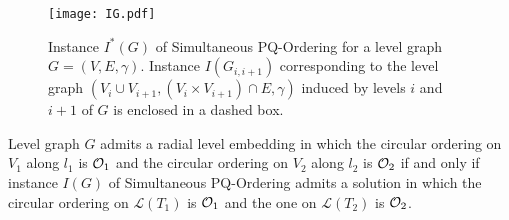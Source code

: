 \documentclass{llncs}
\begin{document}
\begin{figure}[tb]
\centering
\texttt{[image: IG.pdf]}
\caption{Instance $I^*(G)$ of {\sc Simultaneous PQ-Ordering} for a level graph $G=(V,E,\gamma)$. Instance $I(G_{i,i+1})$ corresponding to the level graph $(V_i \cup V_{i+1}, (V_i \times V_{i+1}) \cap E, \gamma)$ induced by levels $i$ and $i+1$ of $G$ is enclosed in a dashed box.}
\label{fig:simpq-instance}
\end{figure}

\begin{lemma}\label{le:equivalence}
Level graph $G$ admits a radial level embedding in which the circular ordering on $V_1$ along $l_1$ is ${\cal O}_1$ and the circular ordering on $V_2$ along $l_2$ is ${\cal O}_2$ if and only if instance $I(G)$ of {\sc Simultaneous PQ-Ordering} admits a solution in which the circular ordering on $\mathcal{L}(T_1)$ is ${\cal O}_1$ and the one on $\mathcal{L}(T_2)$ is ${\cal O}_2$.
\end{lemma}
\end{document}
